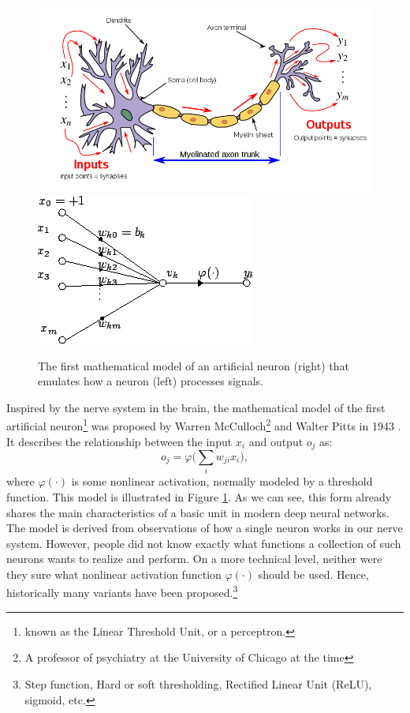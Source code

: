 \documentclass[../../book-main.tex]{subfiles}
\begin{document}
\begin{figure}[t]
    \centering
\includegraphics[width=0.55\linewidth]{figures/neuron.png} \hspace{3mm}   
\includegraphics[width=0.40\linewidth]{figures/Artificial_neuron.png}
    \caption{The first mathematical model of an artificial neuron (right) that emulates how a neuron (left) processes signals. }
    \label{fig:neuron}
\end{figure}

Inspired by the nerve system in the brain, the mathematical model of the first artificial neuron\footnote{known as the  Linear Threshold Unit, or a perceptron.} was proposed by Warren McCulloch\footnote{A professor of psychiatry at the University of Chicago at the time} and Walter Pitts in 1943 \cite{McCulloch-Pitts}. It describes the relationship between the input $x_i$ and output $o_j$ as:
\begin{equation}
    o_j = \varphi\Big( \sum_i w_{ji}x_i\Big),  
\end{equation}
where $\varphi(\cdot)$ is some nonlinear activation, normally modeled by a threshold function. This model is illustrated in Figure \ref{fig:neuron}. As we can see, this form already shares the main characteristics of a basic unit in modern deep neural networks. The model is derived from observations of how a single neuron works in our nerve system. However, people did not know exactly what functions a collection of such neurons wants to realize and perform. On a more technical level, neither were they sure what nonlinear activation function $\varphi(\cdot)$ should be used. Hence, historically many variants have been proposed.\footnote{Step function, Hard or soft thresholding, Rectified Linear Unit (ReLU), sigmoid, etc.
}
\end{document}
